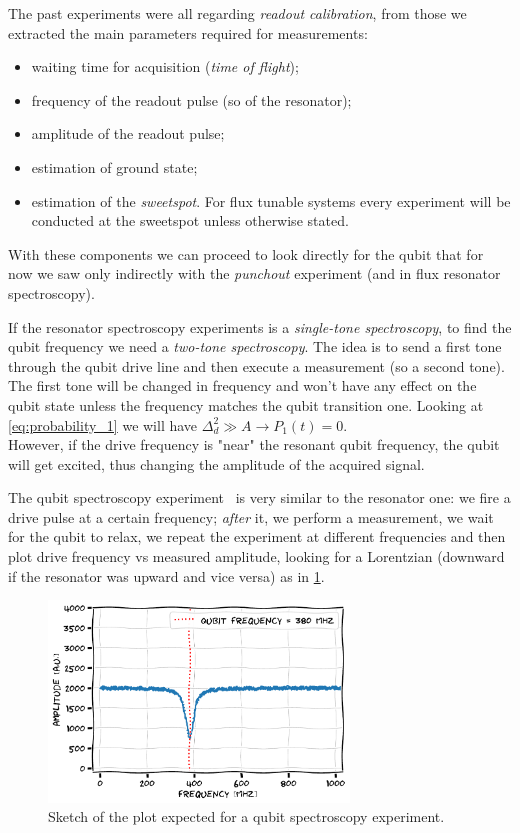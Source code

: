 
The past experiments were all regarding \textit{readout calibration}, from those we extracted the main parameters required for measurements:
\begin{itemize}
    \item waiting time for acquisition (\textit{time of flight});
    \item frequency of the readout pulse (so of the resonator);
    \item amplitude of the readout pulse;
    \item estimation of ground state;
    \item estimation of the \textit{sweetspot}. For flux tunable systems every experiment will be conducted at the sweetspot unless otherwise stated.
\end{itemize}
With these components we can proceed to look directly for the qubit that for now we saw only indirectly with the \textit{punchout} experiment (and in flux resonator spectroscopy).

If the resonator spectroscopy experiments is a \textit{single-tone spectroscopy}, to find the qubit frequency we need a \textit{two-tone spectroscopy}.
The idea is to send a first tone through the qubit drive line and then execute a measurement (so a second tone). 
The first tone will be changed in frequency and won't have any effect on the qubit state unless the frequency matches the qubit transition one.
Looking at \cref{eq:probability_1} we will have $\Delta_d^2\gg A \rightarrow P_1(t) = 0$.\\
However, if the drive frequency is "near" the resonant qubit frequency, the qubit will get excited, thus changing the amplitude of the acquired signal.

The qubit spectroscopy experiment~\cite{Schuster2005, Schuster2007} is very similar to the resonator one: we fire a drive pulse at a certain frequency; \textit{after} it, we perform a measurement, we wait for the qubit to relax, we repeat the experiment at different frequencies and then plot drive frequency vs measured amplitude, looking for a Lorentzian (downward if the resonator was upward and vice versa) as in \cref{fig:qubit_spectroscopy_sketch}.

\begin{figure}[ht]
    \centering
    \includegraphics[width=8cm]{characterization/figures/qubit_spectroscopy_sketch.pdf}
    \caption{Sketch of the plot expected for a qubit spectroscopy experiment.}
    \label{fig:qubit_spectroscopy_sketch}
\end{figure}

